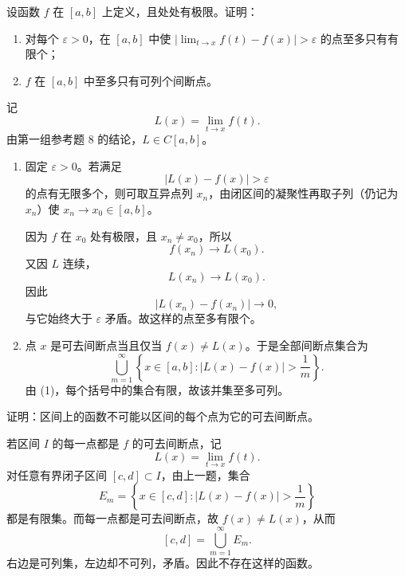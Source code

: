 \begin{xreferenceproblem}[3]
设函数 $f$ 在 $[a,b]$ 上定义，且处处有极限。证明：
  \begin{enumerate}[label=(\arabic*)]
    \item 对每个 $\varepsilon>0$，在 $[a,b]$ 中使 $|\lim_{t\to x}f(t)-f(x)|>\varepsilon$ 的点至多只有有限个；
    \item $f$ 在 $[a,b]$ 中至多只有可列个间断点。
  \end{enumerate}
\end{xreferenceproblem}
\begin{xsolution}
记
\[
 L(x)=\lim_{t\to x}f(t).
\]
由第一组参考题 8 的结论，$L\in C[a,b]$。

\begin{enumerate}[label=(\arabic*)]
 \item 固定 $\varepsilon>0$。若满足
 \[
  |L(x)-f(x)|>\varepsilon
 \]
 的点有无限多个，则可取互异点列 $x_n$，由闭区间的凝聚性再取子列（仍记为 $x_n$）使 $x_n\to x_0\in[a,b]$。

 因为 $f$ 在 $x_0$ 处有极限，且 $x_n\ne x_0$，所以
 \[
  f(x_n)\to L(x_0).
 \]
 又因 $L$ 连续，
 \[
  L(x_n)\to L(x_0).
 \]
 因此
 \[
  |L(x_n)-f(x_n)|\to0,
 \]
 与它始终大于 $\varepsilon$ 矛盾。故这样的点至多有限个。

 \item 点 $x$ 是可去间断点当且仅当 $f(x)\ne L(x)$。于是全部间断点集合为
 \[
  \bigcup_{m=1}^\infty
  \left\{x\in[a,b]:|L(x)-f(x)|>\frac1m\right\}.
 \]
 由 (1)，每个括号中的集合有限，故该并集至多可列。
\end{enumerate}
\end{xsolution}


\begin{xreferenceproblem}[4]
证明：区间上的函数不可能以区间的每个点为它的可去间断点。
\end{xreferenceproblem}
\begin{xsolution}
若区间 $I$ 的每一点都是 $f$ 的可去间断点，记
\[
 L(x)=\lim_{t\to x}f(t).
\]
对任意有界闭子区间 $[c,d]\subset I$，由上一题，集合
\[
 E_m=\left\{x\in[c,d]:|L(x)-f(x)|>\frac1m\right\}
\]
都是有限集。而每一点都是可去间断点，故 $f(x)\ne L(x)$，从而
\[
 [c,d]=\bigcup_{m=1}^\infty E_m.
\]
右边是可列集，左边却不可列，矛盾。因此不存在这样的函数。
\end{xsolution}



